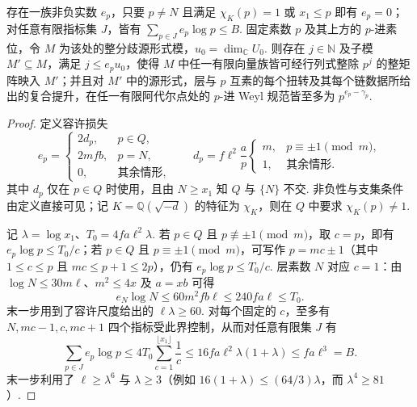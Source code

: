 \begin{lemma}[复合提升的统一局部损失]
\label{lem:a-uniform-divisibility}
\emitthmsource
存在一族非负实数 $e_p$，只要 $p\ne N$ 且满足 $\chi_K(p)=1$ 或 $x_1\le p$ 即有 $e_p=0$；对任意有限指标集 $J$，皆有 $\sum_{p\in J}e_p\log p\le B$. 固定素数 $p$ 及其上方的 $p$-进素位，令 $M$ 为该处的整分歧源形式模，$u_0=\dim_{\mathbb C}U_0$. 则存在 $j\in\mathbb N$ 及子模 $M'\subseteq M$，满足 $j\le e_pu_0$，使得 $M$ 中任一有限向量族皆可经行列式整除 $p^j$ 的整矩阵映入 $M'$；并且对 $M'$ 中的源形式，层与 $p$ 互素的每个扭转及其每个链数据所给出的复合提升，在任一有限阿代尔点处的 $p$-进 Weyl 规范皆至多为 $p^{e_p-\gamma_p}$.
\end{lemma}
\begin{proof}
定义容许损失
\[
 e_p=
 \begin{cases}
 2d_p, &p\in Q,\\
 2mfb,&p=N,\\
 0,&\text{其余情形},
 \end{cases}
 \qquad
 d_p=f\ell^2\frac ap
       \begin{cases}m,&p\equiv\pm1\pmod m,\\ 1,&\text{其余情形}.
       \end{cases}
\]
其中 $d_p$ 仅在 $p\in Q$ 时使用，且由 $N\ge x_1$ 知 $Q$ 与 $\{N\}$ 不交. 非负性与支集条件由定义直接可见；记 $K=\mathbb Q(\sqrt{-d})$ 的特征为 $\chi_K$，则在 $Q$ 中要求 $\chi_K(p)\ne1$.

记 $\lambda=\log x_1$、$T_0=4fa\ell^2\lambda$. 若 $p\in Q$ 且 $p\not\equiv\pm1\pmod m$，取 $c=p$，即有 $e_p\log p\le T_0/c$；若 $p\in Q$ 且 $p\equiv\pm1\pmod m$，可写作 $p=mc\pm1$（其中 $1\le c\le p$ 且 $mc\le p+1\le2p$），仍有 $e_p\log p\le T_0/c$. 层素数 $N$ 对应 $c=1$：由 $\log N\le30m\ell$、$m^2\le4x$ 及 $a=xb$ 可得
\[
 e_N\log N\le60m^2fb\ell\le240fa\ell\le T_0 .
\]
末一步用到了容许尺度给出的 $\ell\lambda\ge60$. 对每个固定的 $c$，至多有 $N,mc-1,c,mc+1$ 四个指标受此界控制，从而对任意有限集 $J$ 有
\[
 \sum_{p\in J} e_p\log p\le
 4T_0\sum_{c=1}^{\lfloor x_1\rfloor}\frac1c
 \le16fa\ell^2\lambda(1+\lambda)\le fa\ell^3=B.
\]
末一步利用了 $\ell\ge\lambda^6$ 与 $\lambda\ge3$（例如 $16(1+\lambda)\le(64/3)\lambda$，而 $\lambda^4\ge81$）.


\end{proof}
